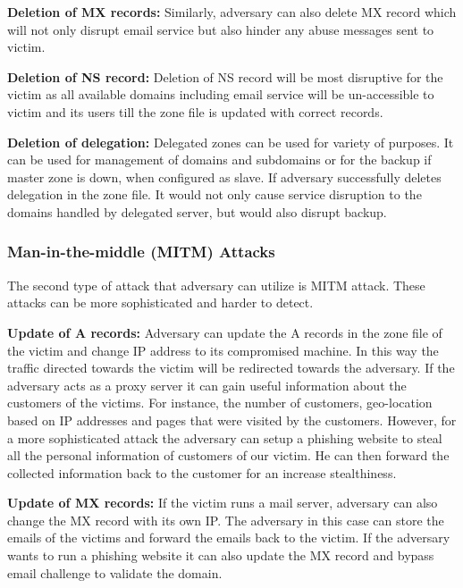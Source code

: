 \textbf{Deletion of MX records:} Similarly, adversary can also delete MX record which will not only disrupt email service but also hinder any abuse messages sent to victim.  

\textbf{Deletion of NS record:} Deletion of NS record will be most disruptive for the victim as all available domains including email service will be un-accessible to victim and its users till the zone file is updated with correct records. 

 \textbf{Deletion of delegation:} Delegated zones can be used for variety of purposes. It can be used for management of domains and subdomains or for the backup if master zone is down,  when configured as slave. If adversary successfully deletes delegation in the zone file. It would not only cause service disruption to the  domains handled by delegated server, but would also disrupt backup. 


\subsubsection{Man-in-the-middle (MITM) Attacks}
The second type of attack that adversary can utilize is MITM attack. These attacks can be more sophisticated and harder to detect. 

\textbf{Update of A records:}
Adversary can update the A records in the zone file of the victim and change IP address to its compromised machine. In this way the traffic directed towards the victim will be redirected towards the adversary. If the adversary acts as a proxy server it can gain useful information about the customers of the victims. For instance, the number of customers, geo-location based on IP addresses and pages that were visited by the customers. However, for a more sophisticated attack the adversary can setup a phishing website to steal all the personal information of customers of our victim. He can then forward the collected information back to the customer for an increase stealthiness. 

\textbf{Update of MX records:} 
If the victim runs a mail server, adversary can also change the MX record with its own IP. The adversary in this case can store the emails of the victims and forward the emails back to the victim. If the adversary wants to run a phishing website it can also update the MX record and bypass email challenge to validate the domain. 





